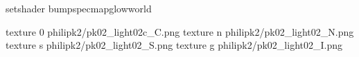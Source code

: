 setshader bumpspecmapglowworld


texture 0 philipk2/pk02_light02c_C.png
texture n philipk2/pk02_light02_N.png
texture s philipk2/pk02_light02_S.png
texture g philipk2/pk02_light02_I.png

